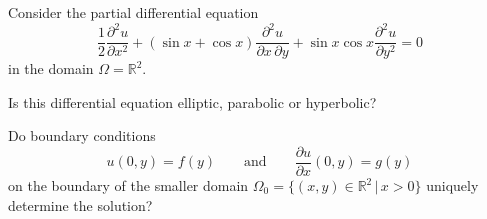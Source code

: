 Consider the partial differential equation 
\begin{equation}
\frac12
\frac{\partial^2 u}{\partial x^2}
+
(\sin x + \cos x)\frac{\partial^2 u}{\partial x\,\partial y}
+
\sin x \cos x
\frac{\partial^2 u}{\partial y^2}
=
0
\label{90000018:equation}
\end{equation}
in the domain $\Omega = \mathbb R^2$.
\begin{teilaufgaben}
\item
Is this differential equation elliptic, parabolic or hyperbolic?
\item
Do boundary conditions
\[
u(0,y) = f(y)
\qquad
\text{and}
\qquad
\frac{\partial u}{\partial x}(0,y) = g(y)
\]
on the boundary of the smaller domain $\Omega_0 = \{ (x,y)\in\mathbb R^2 \,|\, x>0\}$
uniquely determine the solution?
\end{teilaufgaben}


